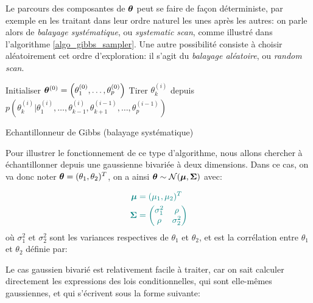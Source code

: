 Le parcours des composantes de ${\bm{\theta}}$ peut se faire de façon déterministe, par exemple en les traitant dans leur ordre naturel les unes après les autres: on parle alors de \textit{balayage systématique}, ou \textit{systematic scan}, comme illustré dans l'algorithme \ref{algo_gibbs_sampler}. Une autre possibilité consiste à choisir aléatoirement cet ordre d'exploration: il s'agit du \textit{balayage aléatoire}, ou \textit{random scan}. \\


\begin{algorithm}
	\begin{algorithmic}
	\State Initialiser ${\bm{\theta}}^{(0)} = \left(\theta_1^{(0)}, \dots, \theta_p^{(0)}\right)$
			\State Tirer $\theta_k^{(i)}$ depuis $p(\theta_k^{(i)} | \theta_1^{(i)}, \dots, \theta_{k-1}^{(i)}, \theta_{k+1}^{(i-1)}, \dots, \theta_p^{(i-1)})$
			\EndFor
		\EndFor
	\end{algorithmic}
	\caption{Echantillonneur de Gibbs (balayage systématique)}
	\label{algo_gibbs_sampler}
\end{algorithm}

Pour illustrer le fonctionnement de ce type d'algorithme, nous allons chercher à échantillonner depuis une gaussienne bivariée à deux dimensions. Dans ce cas, on va donc noter ${\bm{\theta}} = (\theta_1, \theta_2)^T$, on a ainsi ${\bm{\theta}} \sim \mathcal{N}({\bm{\mu}}, {\bm{\Sigma}})$ avec: 

\begin{equation}
\NdFS{
\label{eq_caracs_gaussienne_bivariee}
\begin{split}
\VecMu &= (\mu_1, \mu_2)^T \\
\MatSigma &= \begin{pmatrix}
\sigma_{1}^2 & \corr\\
 \corr & \sigma_{2}^2 
\end{pmatrix}
\end{split}
}
\end{equation} 
où $\sigma_1^2$ et $\sigma_2^2$ sont les variances respectives de $\theta_1$ et $\theta_2$, et \NdFS{$\corr$} est la corrélation entre $\theta_1$ et $\theta_2$ définie par: 

Le cas gaussien bivarié est relativement facile à traiter, car on sait calculer directement les expressions des lois conditionnelles, qui sont elle-mêmes gaussiennes, et qui s'écrivent sous la forme suivante:

